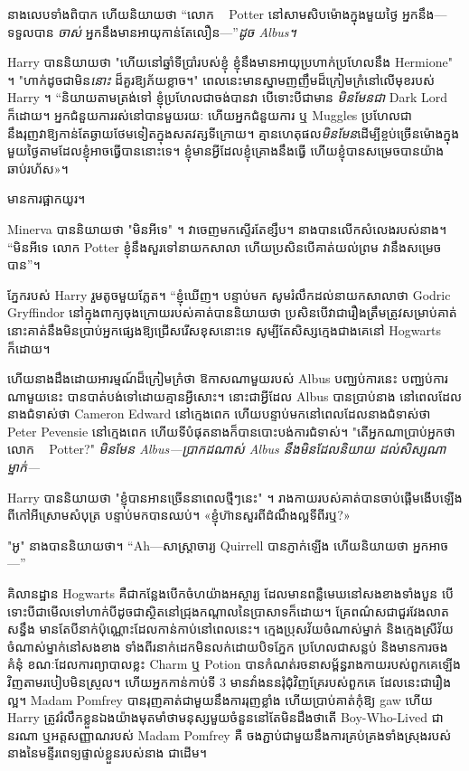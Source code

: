 {នាង​លេប​ទាំង​ពិបាក ហើយ​និយាយ​ថា “លោក ~ Potter នៅ​សាមសិប​ម៉ោង​ក្នុង​មួយ​ថ្ងៃ អ្នក​នឹង—ទទួល​បាន \emph{ចាស់} អ្នក​នឹង​មាន​អាយុ​កាន់​តែ​លឿន—”\emph{ដូច Albus។}

Harry បាននិយាយថា "ហើយនៅឆ្នាំទីប្រាំរបស់ខ្ញុំ ខ្ញុំនឹងមានអាយុប្រហាក់ប្រហែលនឹង Hermione" ។ "ហាក់ដូចជាមិន\emph{នោះ} ដ៏គួរឱ្យភ័យខ្លាច។" ពេលនេះមានស្នាមញញឹមដ៏ក្រៀមក្រំនៅលើមុខរបស់ Harry ។ “និយាយតាមត្រង់ទៅ ខ្ញុំប្រហែលជាចង់បានវា បើទោះបីជាមាន \emph{មិនមែនជា} Dark Lord ក៏ដោយ។ អ្នកជំនួយការរស់នៅបានមួយរយៈ ហើយអ្នកជំនួយការ ឬ Muggles ប្រហែលជានឹងរុញវាឱ្យកាន់តែឆ្ងាយថែមទៀតក្នុងសតវត្សទីក្រោយ។ គ្មានហេតុផល\emph{មិនមែន}ដើម្បីខ្ចប់ច្រើនម៉ោងក្នុងមួយថ្ងៃតាមដែលខ្ញុំអាចធ្វើបាននោះទេ។ ខ្ញុំ​មាន​អ្វី​ដែល​ខ្ញុំ​គ្រោង​នឹង​ធ្វើ ហើយ​ខ្ញុំ​បាន​សម្រេច​បាន​យ៉ាង​ឆាប់​រហ័ស»។

មានការផ្អាកយូរ។

Minerva បាននិយាយថា "មិនអីទេ" ។ វាចេញមកស្ទើរតែខ្សឹប។ នាងបានលើកសំលេងរបស់នាង។ “មិនអីទេ លោក Potter ខ្ញុំនឹងសួរទៅនាយកសាលា ហើយប្រសិនបើគាត់យល់ព្រម វានឹងសម្រេចបាន”។

ភ្នែករបស់ Harry រួមតូចមួយភ្លែត។ “ខ្ញុំឃើញ។ បន្ទាប់មក សូមរំលឹកដល់នាយកសាលាថា Godric Gryffindor នៅក្នុងពាក្យចុងក្រោយរបស់គាត់បាននិយាយថា ប្រសិនបើវាជារឿងត្រឹមត្រូវសម្រាប់គាត់ នោះគាត់នឹងមិនប្រាប់អ្នកផ្សេងឱ្យជ្រើសរើសខុសនោះទេ សូម្បីតែសិស្សក្មេងជាងគេនៅ Hogwarts ក៏ដោយ។

ហើយនាងដឹងដោយអារម្មណ៍ដ៏ក្រៀមក្រំថា ឱកាសណាមួយរបស់ Albus បញ្ឈប់ការនេះ បញ្ឈប់ការណាមួយនេះ បានបាត់បង់ទៅដោយគ្មានអ្វីសោះ។ នោះជាអ្វីដែល Albus បានប្រាប់នាង នៅពេលដែលនាងជំទាស់ថា Cameron Edward នៅក្មេងពេក ហើយបន្ទាប់មកនៅពេលដែលនាងជំទាស់ថា Peter Pevensie នៅក្មេងពេក ហើយទីបំផុតនាងក៏បានបោះបង់ការជំទាស់។ "តើអ្នកណាប្រាប់អ្នកថាលោក ~ Potter?" \emph{មិនមែន Albus—ប្រាកដណាស់ Albus នឹងមិនដែល\emph{និយាយ} ដល់សិស្សណាម្នាក់—}

Harry បាននិយាយថា "ខ្ញុំបានអានច្រើននាពេលថ្មីៗនេះ" ។ រាងកាយ​របស់​គាត់​បាន​ចាប់​ផ្តើម​ងើប​ឡើង​ពី​កៅអី​ស្រោម​សំបុត្រ បន្ទាប់​មក​បាន​ឈប់។ «​ខ្ញុំ​ហ៊ាន​សួរ​ពី​ដំណឹង​ល្អ​ទី​ពីរ​ឬ?»

"អូ" នាងបាននិយាយថា។ “Ah—សាស្រ្តាចារ្យ Quirrell បានភ្ញាក់ឡើង ហើយនិយាយថា អ្នកអាច—”

\later

គិលានដ្ឋាន Hogwarts គឺជាកន្លែងបើកចំហយ៉ាងអស្ចារ្យ ដែលមានពន្លឺមេឃនៅសងខាងទាំងបួន បើទោះបីជាមើលទៅហាក់បីដូចជាស្ថិតនៅជ្រុងកណ្តាលនៃប្រាសាទក៏ដោយ។ គ្រែពណ៌សជាជួរវែងលាតសន្ធឹង មានតែបីនាក់ប៉ុណ្ណោះដែលកាន់កាប់នៅពេលនេះ។ ក្មេងប្រុសវ័យចំណាស់ម្នាក់ និងក្មេងស្រីវ័យចំណាស់ម្នាក់នៅសងខាង ទាំងពីរនាក់ដេកមិនលក់ដោយបិទភ្នែក ប្រហែលជាសន្លប់ និងមានការចងគំនុំ ខណៈដែលការព្យាបាលខ្លះ Charm ឬ Potion បានកំណត់រចនាសម្ព័ន្ធរាងកាយរបស់ពួកគេឡើងវិញតាមរបៀបមិនស្រួល។ ហើយអ្នកកាន់កាប់ទី 3 មានវាំងននរុំជុំវិញគ្រែរបស់ពួកគេ ដែលនេះជារឿងល្អ។ Madam Pomfrey បានរុញគាត់ជាមួយនឹងការរុញខ្លាំង ហើយប្រាប់គាត់កុំឱ្យ gaw ហើយ Harry ត្រូវរំលឹកខ្លួនឯងយ៉ាងមុតមាំថាមនុស្សមួយចំនួននៅតែមិនដឹងថាតើ Boy-Who-Lived ជានរណា ឬអត្តសញ្ញាណរបស់ Madam Pomfrey គឺ ចងភ្ជាប់ជាមួយនឹងការគ្រប់គ្រងទាំងស្រុងរបស់នាងនៃមន្ទីរពេទ្យផ្ទាល់ខ្លួនរបស់នាង ជាដើម។

}
